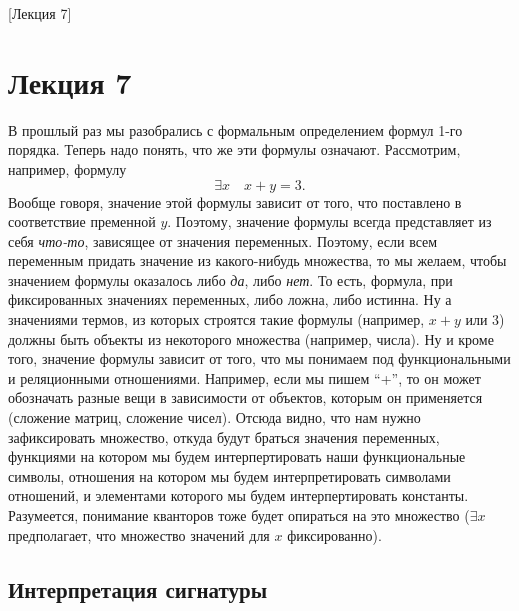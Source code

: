 [Лекция 7]

\section{Лекция 7}

В прошлый раз мы разобрались с формальным определением формул 1-го порядка.
Теперь надо понять, что же эти формулы означают.
Рассмотрим, например, формулу
$$
    \exists x \quad x + y = 3.
$$
Вообще говоря, значение этой формулы зависит от того, что поставлено в соответствие пременной $y$.
Поэтому, значение формулы всегда представляет из себя {\it что-то}, зависящее от значения переменных.
Поэтому, если всем переменным придать значение из какого-нибудь множества, то мы желаем, чтобы значением формулы оказалось либо {\it да}, либо {\it нет}.
То есть, формула, при фиксированных значениях переменных, либо ложна, либо истинна.
Ну а значениями термов, из которых строятся такие формулы (например, $x + y$ или 3) должны быть объекты из некоторого множества (например, числа).
Ну и кроме того, значение формулы зависит от того, что мы понимаем под функциональными и реляционными отношениями.
Например, если мы пишем \enquote{+}, то он может обозначать разные вещи в зависимости от объектов, которым он применяется (сложение матриц, сложение чисел).
Отсюда видно, что нам нужно зафиксировать множество, откуда будут браться значения переменных, функциями на котором мы будем интерпертировать наши функциональные символы, отношения на котором мы будем интерпретировать символами отношений, и элементами которого мы будем интерпертировать константы.
Разумеется, понимание кванторов тоже будет опираться на это множество ($\exists x$ предполагает, что множество значений для $x$ фиксированно).

\subsection{Интерпретация сигнатуры}

